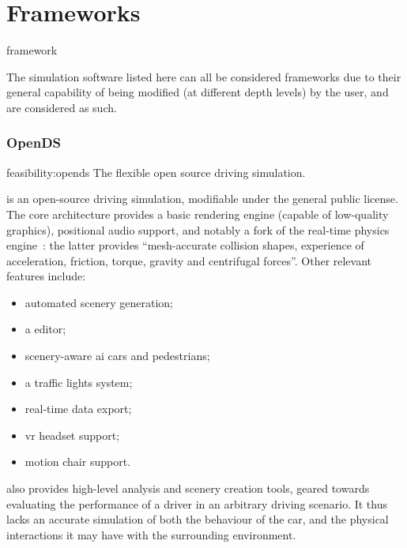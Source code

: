 \section{Frameworks}\label{sc:stateoftheart:frameworks}

\begin{definition}{framework}
\end{definition}

The simulation software listed here can all be considered \glspl{framework} due to their general capability of being modified (at different depth levels) by the user, and are considered as such.

\subsubsection{OpenDS}

\begin{excerpt}{feasibility:opends}
    The flexible open source driving simulation.
\end{excerpt}

 is an open-source driving simulation, modifiable under the  general public license. The core architecture provides a basic rendering engine (capable of low-quality graphics), positional audio support, and notably a  fork of the  real-time physics engine~\cite{feasibility:bullet}: the latter provides \enquote{mesh-accurate collision shapes, experience of acceleration, friction, torque, gravity and centrifugal forces}{\cite{feasibility:opendsfeatures}}. Other relevant features include:

\begin{itemize}
    \item automated scenery generation;
    \item a  editor;
	\item scenery-aware \gls{ai} cars and pedestrians;
    \item a traffic lights system;
    \item real-time data export;
    \item {} \gls{vr} headset support;
    \item motion chair support.
\end{itemize}

 also provides high-level analysis and scenery creation tools, geared towards evaluating the performance of a driver in an arbitrary driving scenario. It thus lacks an accurate simulation of both the behaviour of the car, and the physical interactions it may have with the surrounding environment.

